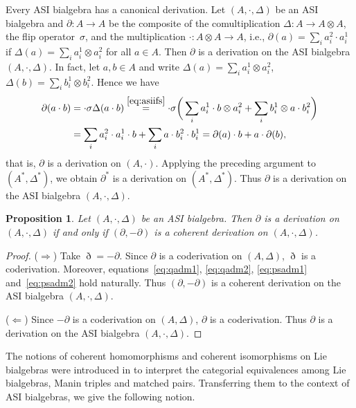 \documentclass[10pt,a4paper]{amsart}
\numberwithin{equation}{section}
\newtheorem{Proposition}[Theorem]{Proposition}
{ \theoremstyle{definition}
	\newtheorem{Definition}[Theorem]{Definition}
	\newtheorem{Note}[Theorem]{Note}
	\newtheorem{Example}[Theorem]{Example}
	\newtheorem{Remark}[Theorem]{Remark} }
\begin{document}
\begin{Example}
Every ASI bialgebra has a canonical derivation.
Let $(A, \cdot, \Delta)$ be an ASI bialgebra and $\partial\colon A \to A$ be
the composite of the comultiplication $\Delta\colon A \to A \otimes A$,
the flip operator~$\sigma$, and the multiplication $\cdot\colon A \otimes A \to A$,
i.e., $\partial(a) = \sum_i a_i^2 \cdot a_i^1$ if $\Delta(a) = \sum_i a_i^1 \otimes a_i^2$
for all $a \in A$.
Then $\partial$ is a derivation on the ASI bialgebra $(A, \cdot, \Delta)$.
In fact, let $a, b \in A$ and write
$\Delta(a) = \sum_i a_i^1 \otimes a_i^2$, $\Delta(b) = \sum_i b_i^1 \otimes b_i^2$.
Hence we have
\begin{align*}
 \partial(a \cdot b) & = \cdot \sigma \Delta(a \cdot b) \overset{\eqref{eq:asiifs}}{=} \cdot \sigma \bigg(\sum_i a_i^1 \cdot b \otimes a_i^2 + \sum_i b_i^1 \otimes a \cdot b_i^2\bigg)\\
 & = \sum_i a_i^2 \cdot a_i^1 \cdot b + \sum_i a \cdot b_i^2 \cdot b_i^1 = \partial(a) \cdot b + a \cdot \partial(b),
\end{align*}
that is, $\partial$ is a derivation on $(A, \cdot)$.
Applying the preceding argument to $(A^*, \Delta^*)$,
we obtain $\partial^*$ is a derivation on $(A^*, \Delta^*)$.
Thus $\partial$ is a derivation on the ASI bialgebra $(A, \cdot, \Delta)$.
\end{Example}


\begin{Proposition}
 Let $(A, \cdot, \Delta)$ be an ASI bialgebra.
 Then $\partial$ is a derivation on $(A, \cdot, \Delta)$ if and only if $(\partial, -\partial)$ is a coherent derivation on $(A, \cdot, \Delta)$.
\end{Proposition}
\begin{proof}
 ($\Longrightarrow$)
 Take $\eth = -\partial$.
 Since $\partial$ is a coderivation on $(A, \Delta)$, $\eth$ is a coderivation.
 Moreover, equations~\eqref{eq:qadm1}, \eqref{eq:qadm2}, \eqref{eq:psadm1} and~\eqref{eq:psadm2} hold naturally.
 Thus $(\partial, -\partial)$ is a coherent derivation on the ASI bialgebra $(A, \cdot, \Delta)$.

 ($\Longleftarrow$)
 Since $-\partial$ is a coderivation on $(A, \Delta)$, $\partial$ is a coderivation.
 Thus $\partial$ is a derivation on the ASI bialgebra $(A, \cdot, \Delta)$.
\end{proof}

The notions of coherent homomorphisms and coherent isomorphisms on Lie bialgebras were introduced in \cite{BGS} to interpret the categorial equivalences among Lie bialgebras, Manin triples and matched pairs.
Transferring them to the context of ASI bialgebras, we give the following notion.
\end{document}
